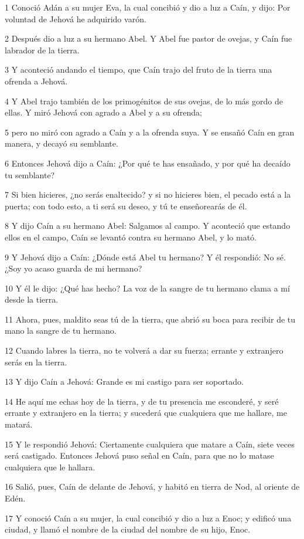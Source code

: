 \par 1 Conoció Adán a su mujer Eva, la cual concibió y dio a luz a Caín, y dijo: Por voluntad de Jehová he adquirido varón.
\par 2 Después dio a luz a su hermano Abel. Y Abel fue pastor de ovejas, y Caín fue labrador de la tierra.
\par 3 Y aconteció andando el tiempo, que Caín trajo del fruto de la tierra una ofrenda a Jehová.
\par 4 Y Abel trajo también de los primogénitos de sus ovejas, de lo más gordo de ellas. Y miró Jehová con agrado a Abel y a su ofrenda;
\par 5 pero no miró con agrado a Caín y a la ofrenda suya. Y se ensañó Caín en gran manera, y decayó su semblante.
\par 6 Entonces Jehová dijo a Caín: ¿Por qué te has ensañado, y por qué ha decaído tu semblante?
\par 7 Si bien hicieres, ¿no serás enaltecido? y si no hicieres bien, el pecado está a la puerta; con todo esto, a ti será su deseo, y tú te enseñorearás de él.
\par 8 Y dijo Caín a su hermano Abel: Salgamos al campo. Y aconteció que estando ellos en el campo, Caín se levantó contra su hermano Abel, y lo mató.
\par 9 Y Jehová dijo a Caín: ¿Dónde está Abel tu hermano? Y él respondió: No sé. ¿Soy yo acaso guarda de mi hermano?
\par 10 Y él le dijo: ¿Qué has hecho? La voz de la sangre de tu hermano clama a mí desde la tierra.
\par 11 Ahora, pues, maldito seas tú de la tierra, que abrió su boca para recibir de tu mano la sangre de tu hermano.
\par 12 Cuando labres la tierra, no te volverá a dar su fuerza; errante y extranjero serás en la tierra.
\par 13 Y dijo Caín a Jehová: Grande es mi castigo para ser soportado.
\par 14 He aquí me echas hoy de la tierra, y de tu presencia me esconderé, y seré errante y extranjero en la tierra; y sucederá que cualquiera que me hallare, me matará.
\par 15 Y le respondió Jehová: Ciertamente cualquiera que matare a Caín, siete veces será castigado. Entonces Jehová puso señal en Caín, para que no lo matase cualquiera que le hallara.
\par 16 Salió, pues, Caín de delante de Jehová, y habitó en tierra de Nod, al oriente de Edén.
\par 17 Y conoció Caín a su mujer, la cual concibió y dio a luz a Enoc; y edificó una ciudad, y llamó el nombre de la ciudad del nombre de su hijo, Enoc.
